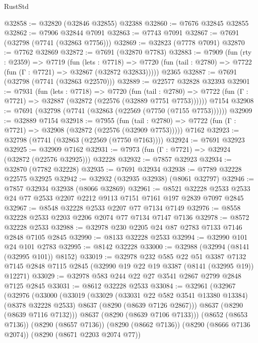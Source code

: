 \begin{lexlean}{RustStd}
\begin{coremodule}
@32858 := @32820 (@32846 @32855) @32388
@32860 := @7676 @32845 @32855
@32862 := @7906 @32844 @7091
@32863 := @7743 @7091
@32867 := @7691 (@32798 (@7741 (@32863 @7756)))
@32869 := @32823 (@7778 @7091)
@32870 := @7762 @32869
@32872 := @7691 (@32870 @7783)
@32883 := @7909
    (fun (rty : @2359) =>
    @7719
      (fun (lets : @7718) =>
      @7720 (fun (tail : @2780) => @7722 (fun (Γ : @7721) => @32867 (@32872 @32833)))))
    @2365
@32887 := @7691 (@32798 (@7741 (@32863 @22570)))
@32889 := @22577 @32828 @32393
@32901 := @7931
    (fun (lets : @7718) =>
    @7720
      (fun (tail : @2780) =>
      @7722 (fun (Γ : @7721) => @32887 (@32872 (@22576 (@32889 @7751 @7753))))))
    @7154
@32908 := @7691 (@32798 (@7741 (@32863 (@22569 (@7750 (@7155 @7753))))))
@32909 := @32889 @7154
@32918 := @7955
    (fun (tail : @2780) => @7722 (fun (Γ : @7721) => @32908 (@32872 (@22576 (@32909 @7753)))))
    @7162
@32923 := @32798 (@7741 (@32863 (@22569 (@7750 @7163))))
@32924 := @7691 @32923
@32925 := @32909 @7162
@32931 := @7973 (fun (Γ : @7721) => @32924 (@32872 (@22576 @32925))) @32228
@32932 := @7857 @32923
@32934 := @32870 (@7782 @32228)
@32935 := @7691 @32934
@32938 := @7789 @32228 @22575 @32925
@32942 := @32932 (@32935 @32938) (@8061 @32797)
@32946 := @7857 @32934 @32938 (@8066 @32869)
@32961 := @8521
    @32228
    @2533
    @2533
    @24
    @77
    @2533
    @2207
    @2212
    @9113
    @7151
    @7161
    @197
    @2839
    @7097
    @2845
@32967 := @8548 @32228 @2533 @2207 @77 @7134 @7149
@32976 := @8558 @32228 @2533 @2203 @2206 @2074 @77 @7134 @7147 @7136
@32978 := @8572 @32228 @2533
@32988 := @32978 @230 @2205 @24 @87 @2783 @7133 @7146 @2848 @7105 @2845
@32990 := @8133 @32228 @2533
@32994 := @32990 @101 @24 @101 @2783
@32995 := @8142 @32228
@33000 := @32988 (@32994 (@8141 (@32995 @101)) @8152)
@33019 := @32978
    @232
    @585
    @22
    @51
    @3387
    @7132
    @7145
    @2848
    @7115
    @2845
    (@32990 @19 @22 @19 @3387 (@8141 (@32995 @19)) @12271)
@33029 := @32978 @583 @244 @22 @27 @3541 @2867 @2799 @2848 @7125 @2845
@33031 := @8612 @32228 @2533
@33084 := @32961
    (@32967
      (@32976
        (@33000
          (@33019
            (@33029
              (@33031 @22 @582 @3541 @13380 @13384)
              (@8378 @32228 @2533)
              @8637
              (@8290 (@8639 @7126 @2867)))
            @8637
            (@8290 (@8639 @7116 @7132)))
          @8637
          (@8290 (@8639 @7106 @7133)))
        (@8652 (@8653 @7136))
        (@8290 (@8657 @7136))
        (@8290 (@8662 @7136))
        (@8290 (@8666 @7136 @2074))
        (@8290 (@8671 @2203 @2074 @77))

\end{coremodule}
\end{lexlean}
